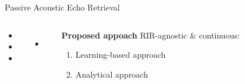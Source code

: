 \begin{frame}[t]{\alert{Passive} Acoustic Echo Retrieval \hfill\faBook}
        \vspace{1em}
        \begin{columns}[T,onlytextwidth] %
            \small
                \begin{itemize}
                    \item[\xmark] 
                    \item[\xmark] 
                    \item[\xmark] 
                \end{itemize}
                \begin{itemize}
                    \item[\xmark] 
                    \\
                \end{itemize}


                \begin{mycontriblock}{\textcolor{myred}{\textbf{Proposed appoach}}}
                    \small
                    RIR-agnostic \& continuous:
                    \begin{enumerate}
                        \item Learning-based approach
                        \item Analytical approach
                    \end{enumerate}
                \end{mycontriblock}
        \end{columns}

\end{frame}


\subsection{\blaster}

